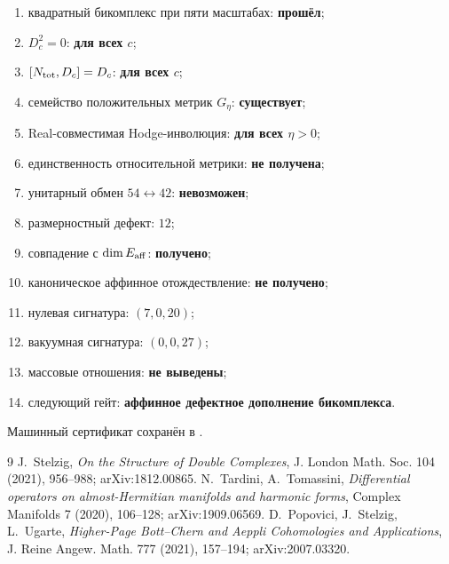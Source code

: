 \begin{protocol}
\begin{enumerate}
 \item квадратный бикомплекс при пяти масштабах: \textbf{прошёл};
 \item $D_c^2=0$: \textbf{для всех $c$};
 \item $[N_{\rm tot},D_c]=D_c$: \textbf{для всех $c$};
 \item семейство положительных метрик $G_\eta$: \textbf{существует};
 \item Real-совместимая Hodge-инволюция: \textbf{для всех $\eta>0$};
 \item единственность относительной метрики: \textbf{не получена};
 \item унитарный обмен $54\leftrightarrow42$: \textbf{невозможен};
 \item размерностный дефект: \textbf{$12$};
 \item совпадение с $\dim E_{\rm aff}$: \textbf{получено};
 \item каноническое аффинное отождествление: \textbf{не получено};
 \item нулевая сигнатура: \textbf{$(7,0,20)$};
 \item вакуумная сигнатура: \textbf{$(0,0,27)$};
 \item массовые отношения: \textbf{не выведены};
 \item следующий гейт: \textbf{аффинное дефектное дополнение бикомплекса}.
\end{enumerate}
\end{protocol}

Машинный сертификат сохранён в
.

\begin{thebibliography}{9}
J.~Stelzig,
\emph{On the Structure of Double Complexes},
J. London Math. Soc. 104 (2021), 956--988; arXiv:1812.00865.
N.~Tardini, A.~Tomassini,
\emph{Differential operators on almost-Hermitian manifolds and harmonic
forms}, Complex Manifolds 7 (2020), 106--128; arXiv:1909.06569.
D.~Popovici, J.~Stelzig, L.~Ugarte,
\emph{Higher-Page Bott--Chern and Aeppli Cohomologies and Applications},
J. Reine Angew. Math. 777 (2021), 157--194; arXiv:2007.03320.
\end{thebibliography}
